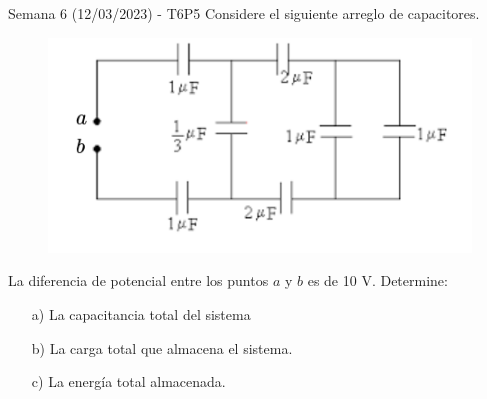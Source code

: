 \begin{frame}{Semana 6 (12/03/2023) - T6P5}
    Considere el siguiente arreglo de capacitores.
    
    \begin{figure}[H]
        \centering
        \includegraphics[scale=0.5]{figures/t6p5.png}
    \end{figure}
    
    La diferencia de potencial entre los puntos $a$ y $b$ es de 10 V. Determine:
    
    \begin{itemize}
        \item[a)] La capacitancia total del sistema
        \item[b)] La carga total que almacena el sistema.
        \item[c)] La energía total almacenada.
    \end{itemize}
\end{frame}

